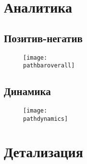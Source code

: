 
    \chapter{Аналитика}

        \section{Позитив-негатив}
        \newcommand{\pathbaroverall}{\VAR{bar_overall}}
        \begin{figure}[H]
            \centering\texttt{[image: \\pathbaroverall]}
        \end{figure}

    \section{Динамика}
    \newcommand{\pathdynamics}{\VAR{dynamics}}
    \begin{figure}[H]
        \centering\texttt{[image: \\pathdynamics]}
    \end{figure}


    \chapter{Детализация}
